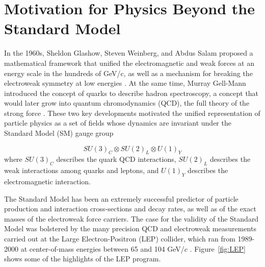 \documentclass[dissertation.tex]{subfiles}
\begin{document}
\chapter{Motivation for Physics Beyond the Standard Model}
\label{chap:Motivation for Physics Beyond the Standard Model}

In the 1960s, Sheldon Glashow, Steven Weinberg, and Abdus Salam proposed a mathematical framework that unified the electromagnetic and weak forces at an energy scale in the hundreds of GeV/c, as well as a mechanism for breaking the electroweak symmetry at low energies \cite{Glashow_Weinberg_and_Salam}.  At the same time, Murray Gell-Mann introduced the concept of quarks to describe hadron spectroscopy, a concept that would later grow into quantum chromodynamics (QCD), the full theory of the strong force \cite{Gell-Mann}.  These two key developments motivated the unified representation of particle physics as a set of fields whose dynamics are invariant under the Standard Model (SM) gauge group

\begin{equation}
SU(3)_{C} \otimes SU(2)_{L} \otimes U(1)_{Y}
\end{equation}
%
where $SU(3)_{C}$ describes the quark QCD interactions, $SU(2)_{L}$ describes the weak interactions among quarks and leptons, and $U(1)_{Y}$ describes the electromagnetic interaction.

The Standard Model has been an extremely successful predictor of particle production and interaction cross-sections and decay rates, as well as of the exact masses of the electroweak force carriers.  The case for the validity of the Standard Model was bolstered by the many precision QCD and electroweak measurements carried out at the Large Electron-Positron (LEP) collider, which ran from 1989-2000 at center-of-mass energies between 65 and 104 GeV/$c$ \cite{Drees}.  Figure~\ref{fig:LEP} shows some of the highlights of the LEP program.
\end{document}
